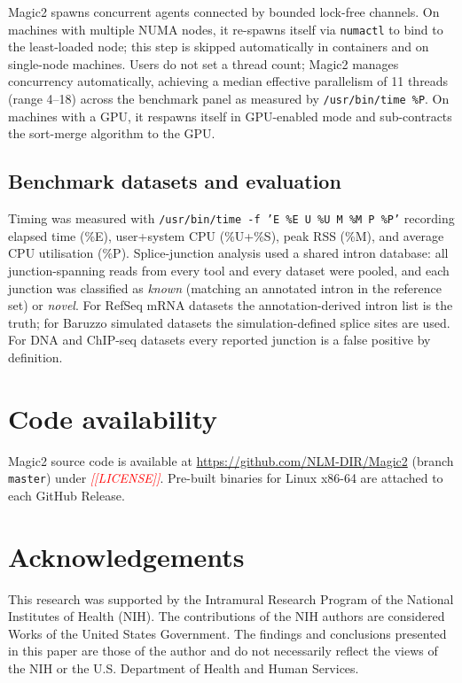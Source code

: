 \documentclass[11pt]{article}
\newcommand{\edcomment}[1]{\textcolor{red}{\textit{[#1]}}}
\begin{document}
Magic2 spawns concurrent agents connected by bounded lock-free channels.
On machines with multiple NUMA nodes, it re-spawns itself via
\texttt{numactl} to bind to the least-loaded node; this step is skipped
automatically in containers and on single-node machines.
Users do not set a thread count; Magic2 manages concurrency
automatically, achieving a median effective parallelism of 11 threads
(range 4--18) across the benchmark panel as measured by
\texttt{/usr/bin/time \%P}. On machines with a GPU, it respawns itself
in GPU-enabled mode and sub-contracts the sort-merge algorithm to the GPU.

\subsection*{Benchmark datasets and evaluation}

Timing was measured with \texttt{/usr/bin/time -f 'E \%E U \%U M \%M P
\%P'} recording elapsed time (\%E), user+system CPU (\%U+\%S), peak
RSS (\%M), and average CPU utilisation (\%P).
Splice-junction analysis used a shared intron database: all
junction-spanning reads from every tool and every dataset were pooled,
and each junction was classified as \emph{known} (matching an annotated
intron in the reference set) or \emph{novel}.
For RefSeq mRNA datasets the annotation-derived intron list is the
truth; for Baruzzo simulated datasets the simulation-defined splice
sites are used.
For DNA and ChIP-seq datasets every reported junction is a false
positive by definition.

\section*{Code availability}

Magic2 source code is available at
\url{https://github.com/NLM-DIR/Magic2} (branch \texttt{master})
under \edcomment{[LICENSE]}.
Pre-built binaries for Linux x86-64 are attached to each GitHub
Release.

\section*{Acknowledgements}
This research was supported by the Intramural Research Program of the National Institutes of Health (NIH). The contributions of the NIH authors are considered Works of the United States Government. The findings and conclusions presented in this paper are those of the author and do not necessarily reflect the views of the NIH or the U.S. Department of Health and Human Services.
\end{document}
